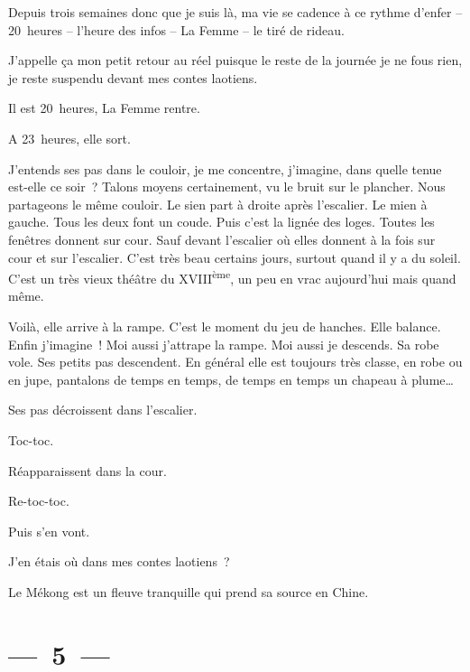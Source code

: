 \documentclass[twoside]{book} %
\begin{document}
\noindent Depuis trois semaines donc que je suis là, ma vie se cadence à ce rythme d’enfer – 20 heures – l’heure des infos – La Femme – le tiré de rideau.\par
J’appelle ça mon petit retour au réel puisque le reste de la journée je ne fous rien, je reste suspendu devant mes contes laotiens.\par
Il est 20 heures, La Femme rentre.\par
A 23 heures, elle sort.\par
J’entends ses pas dans le couloir, je me concentre, j’imagine, dans quelle tenue est-elle ce soir ? Talons moyens certainement, vu le bruit sur le plancher. Nous partageons le même couloir. Le sien part à droite après l’escalier. Le mien à gauche. Tous les deux font un coude. Puis c’est la lignée des loges. Toutes les fenêtres donnent sur cour. Sauf devant l’escalier où elles donnent à la fois sur cour et sur l’escalier. C’est très beau certains jours, surtout quand il y a du soleil. C’est un très vieux théâtre du XVIII\textsuperscript{ème}, un peu en vrac aujourd’hui mais quand même.\par
Voilà, elle arrive à la rampe. C’est le moment du jeu de hanches. Elle balance. Enfin j’imagine ! Moi aussi j’attrape la rampe. Moi aussi je descends. Sa robe vole. Ses petits pas descendent. En général elle est toujours très classe, en robe ou en jupe, pantalons de temps en temps, de temps en temps un chapeau à plume…\par
Ses pas décroissent dans l’escalier.\par
Toc-toc.\par
Réapparaissent dans la cour.\par
Re-toc-toc.\par
Puis s’en vont.\par
J’en étais où dans mes contes laotiens ?\par
Le Mékong est un fleuve tranquille qui prend sa source en Chine.

\section[{— 5 —}]{— 5 —}
\renewcommand{\leftmark}{— 5 —}
\end{document}
